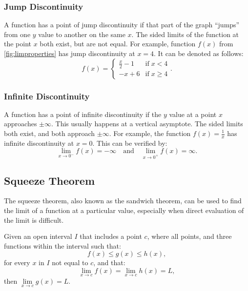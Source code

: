 \documentclass[12pt]{article}
\begin{document}
\subsubsection{Jump Discontinuity}
A function has a point of jump discontinuity if that part of the graph ``jumps'' from one $y$ value to another on the same $x$. The sided limits of the function at the point $x$ both exist, but are not equal. For example, function $f(x)$ from \ref{fig:limproperties} has jump discontinuity at $x = 4$. It can be denoted as follows:
\[ f(x) = \begin{cases}
    \frac{x}{2} - 1 & \text{if} \; x < 4 \\
    -x + 6 & \text{if} \; x \ge 4
\end{cases}. \]

\subsubsection{Infinite Discontinuity}
A function has a point of infinite discontinuity if the $y$ value at a point $x$ approaches $\pm \infty$. This usually happens at a vertical asymptote. The sided limits both exist, and both approach $\pm \infty$. For example, the function $f(x) = \frac{1}{x}$ has infinite discontinuity at $x = 0$. This can be verified by:
\[ \lim_{x \to 0^-} f(x) = -\infty \quad \text{and} \quad \lim_{x \to 0^+} f(x) = \infty. \]

\subsection{Squeeze Theorem}
The squeeze theorem, also known as the sandwich theorem, can be used to find the limit of a function at a particular value, especially when direct evaluation of the limit is difficult.

Given an open interval $I$ that includes a point $c$, where all points, and three functions within the interval such that:
\[ f(x) \le g(x) \le h(x), \]
for every $x$ in $I$ not equal to $c$, and that:
\[ \lim_{x \to c} f(x) = \lim_{x \to c} h(x) = L, \]
then $\lim \limits_{x \to c} g(x) = L$.
\end{document}
